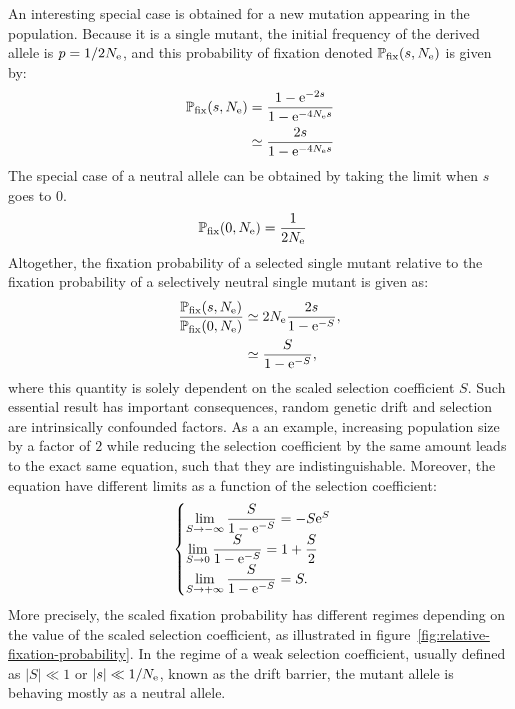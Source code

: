 An interesting special case is obtained for a new mutation appearing in the population.
Because it is a single mutant, the initial frequency of the derived \gls{allele} is $p = 1 / 2 N_{\text{e}}$, and this probability of fixation denoted $\mathbb{P}_{\text{fix}}(s, N_{\text{e}})$ is given by:
\begin{align}
    \mathbb{P}_{\text{fix}}(s, N_{\text{e}}) & = \dfrac{1 - \text{e}^{-2 s}}{1 - \text{e}^{-4 N_{\text{e}} s}} \\
    & \simeq  \dfrac{2 s }{1 - \text{e}^{-4 N_{\text{e}} s}}
\end{align}
The special case of a \gls{neutral} \gls{allele} can be obtained by taking the limit when $s$ goes to $0$.
\begin{align}
    \mathbb{P}_{\text{fix}}(0, N_{\text{e}}) & = \dfrac{1}{2 N_{\text{e}}}
\end{align}
Altogether, the fixation probability of a selected single mutant relative to the fixation probability of a selectively \gls{neutral} single mutant is given as:
\begin{align}
    \dfrac{\mathbb{P}_{\text{fix}}(s, N_{\text{e}})}{\mathbb{P}_{\text{fix}}(0, N_{\text{e}})} & \simeq 2 N_{\text{e}} \dfrac{2s}{1 - \text{e}^{-S}}, \\
    & \simeq  \dfrac{S}{1 - \text{e}^{-S}}, \label{eq:p-fix}
\end{align}
where this quantity is solely dependent on the scaled selection coefficient $S$.
Such essential result has important consequences, random \gls{genetic drift} and selection are intrinsically confounded factors.
As a an example, increasing population size by a factor of $2$ while reducing the selection coefficient by the same amount leads to the exact same equation, such that they are indistinguishable.
Moreover, the equation have different limits as a function of the selection coefficient:
\begin{gather}
    \begin{cases}
        \lim\limits_{S \to -\infty} \dfrac{S}{1 - \text{e}^{-S}} = -S\text{e}^{S} \\
        \lim\limits_{S \to 0} \dfrac{S}{1 - \text{e}^{-S}} = 1 + \dfrac{S}{2}\\
        \lim\limits_{S \to + \infty} \dfrac{S}{1 - \text{e}^{-S}} = S.
    \end{cases} \label{eq:limits-proba-fix}
\end{gather}
More precisely, the scaled fixation probability has different regimes depending on the value of the scaled selection coefficient, as illustrated in figure~\ref{fig:relative-fixation-probability}.
In the regime of a weak selection coefficient, usually defined as $|S| \ll 1$ or $|s| \ll 1 / N_{\text{e}}$, known as the drift barrier, the mutant \gls{allele} is behaving mostly as a \gls{neutral} \gls{allele}.

